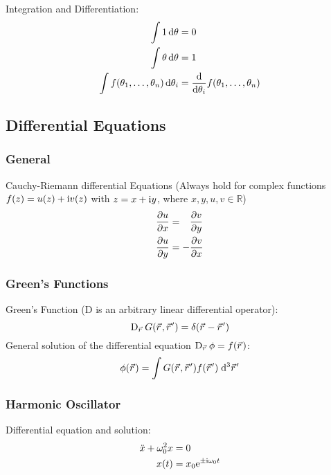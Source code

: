 			\noindent
			Integration and Differentiation:
			\begin{equation}
				\begin{aligned}
					\int 1\,\dd\theta &= 0 \\
					\int \theta\,\dd\theta &= 1 \\
					\int f(\theta_1,\dots,\theta_n)\,\dd\theta_i &= \dv{\theta_i}f(\theta_1,\dots,\theta_n)
				\end{aligned}
			\end{equation}
			
	\subsection{Differential Equations}
		\subsubsection{General}
			\noindent
			Cauchy-Riemann differential Equations (Always hold for complex functions $f(z)=u(z)+\mathrm{i} v(z)$ with $z=x+\mathrm{i} y$, where $x,y,u,v\in\mathbb{R}$)
			\begin{equation}
				\begin{aligned}
					\pdv{u}{x} &= \phantom{-}\pdv{v}{y} \\
					\pdv{u}{y} &= -\pdv{v}{x} \\
				\end{aligned}
			\end{equation}


		\subsubsection{Green's Functions}
			\noindent
			Green's Function ($\mathrm{D}$ is an arbitrary linear differential operator):
			\begin{equation}
				\mathrm{D}_{\vec{r}}\, G\qty(\vec{r},\vec{r}') = \delta\qty(\vec{r} - \vec{r}')
			\end{equation}
			General solution of the differential equation $\mathrm{D}_{\vec{r}}\, \phi = f\qty(\vec{r})$:
			\begin{equation}
				\phi\qty(\vec{r}) = \int G\qty(\vec{r},\vec{r}')f\qty(\vec{r}')\;\dd^3\vec{r}'
			\end{equation}

		\subsubsection{Harmonic Oscillator}
			\noindent
			Differential equation and solution:
			\begin{equation}
				\begin{aligned}
					\ddot{x}+\omega_0^2 x &= 0 \\
					x(t) &= x_0 \mathrm{e}^{\pm \mathrm{i}\omega_0 t}
				\end{aligned}
			\end{equation}

